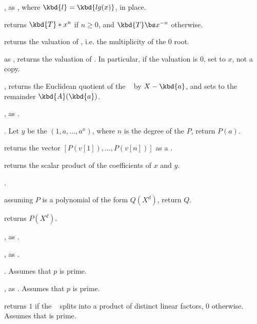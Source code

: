 , as , where
$\kbd{l} = \kbd{lg(x)}$, in place.

 returns $\kbd{T} * x^n$ if $n\geq 0$,
and $\kbd{T} \bs x^{-n}$ otherwise.

 returns the valuation of , i.e. the
multiplicity of the $0$ root.

 as , returns the
valuation of . In particular, if the valuation is $0$, set 
to $x$, not a copy.

, returns the
Euclidean quotient of the ~ by $X - \kbd{a}$, and sets
 to the remainder $ \kbd{A}(\kbd{a})$.

, as .


. Let $y$ be
the  $(1,a,\dots,a^n)$, where $n$ is the degree of the
 $P$, return $P(a)$.

 returns the vector
$[P(v[1]),\ldots,P(v[n])]$ as a .

 returns the scalar product
of the coefficients of $x$ and $y$.

.


 assuming $P$ is a polynomial of the
form $Q(X^d)$, return $Q$.

 returns $P(X^d)$.

, as .

, as .

. Assumes that $p$ is prime.

, as .
Assumes that $p$ is prime.

 returns $1$ if the
~ splits into a product of distinct linear factors, $0$
otherwise. Assumes that  is prime.

